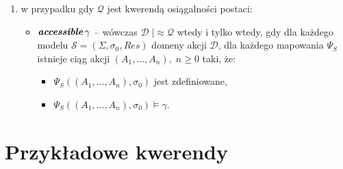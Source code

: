 \documentclass[11pt,a4paper]{article}
\DeclareMathOperator{\Accessible}{\textbf{\textit{accessible}}}
\begin{document}
\begin{enumerate}
        \item w przypadku gdy $\mathcal{Q}$ jest kwerendą osiągalności postaci:
        \begin{itemize}
            \item $\Accessible \gamma$ -- wówczas $\mathcal{D} \; |\!\!\!\!\!\approx \mathcal{Q}$ wtedy i tylko wtedy, gdy dla każdego modelu $\mathcal{S} = (\Sigma,\sigma_0,Res)$ domeny akcji $\mathcal{D}$, dla każdego mapowania $\Psi_S$ istnieje ciąg akcji $(A_1,...,A_n), \; n \geq 0$ taki, że:
            \begin{itemize}
                \item $\Psi_S((A_1,...,A_n),\sigma_{0})$ jest zdefiniowane,
                \item $\Psi_S((A_1,...,A_n),\sigma_{0}) \models \gamma$.
            \end{itemize}
        \end{itemize}
    \end{enumerate}


\section{Przykładowe kwerendy}

\end{document}
